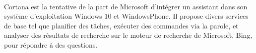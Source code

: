 \paragraph{}
Cortana est la tentative de la part de Microsoft d'intégrer un assistant dans son système d'exploitation Windows 10 et WindowsPhone. Il propose divers services de base tel que planifier des tâches, exécuter des commandes via la parole, et analyser des résultats de recherche sur le moteur de recherche de Microsoft, Bing, pour répondre à des questions.
%


%
